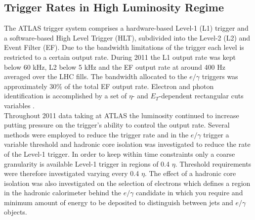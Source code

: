 \subsection{Trigger Rates in High Luminosity Regime}

	The ATLAS trigger system comprises a
	hardware-based Level-1 (L1) trigger and a software-based
	High Level Trigger (HLT), subdivided into the Level-2
	(L2) and Event Filter (EF). Due to the bandwidth
	limitations of the trigger each level is restricted to a
	certain output rate. During 2011 the L1 output rate was
	kept below 60 kHz, L2 below 5 kHz and the EF output
	rate at around 400 Hz averaged over the LHC fills. The
	bandwidth allocated to the $e/\gamma$ triggers was
	approximately 30\% of the total EF output rate.
	Electron and photon identification is accomplished by a
	set of $\eta$- and $E_{T}$-dependent rectangular cuts variables
	\cite{trig1, trig2}.\\
	Throughout 2011 data taking at ATLAS the luminosity continued to increase putting pressure on the trigger's ability to control the output rate. Several methods were employed to reduce the trigger rate and in the $e/\gamma$ trigger a variable threshold and hadronic core isolation was investigated to reduce the rate of the Level-1 trigger. In order to keep within time constraints only a coarse granularity is available Level-1 trigger in regions of 0.4 $\eta$. Threshold requirements were therefore investigated varying every 0.4 $\eta$. The effect of a hadronic core isolation was also investigated on the selection of electrons which defines a region in the hadronic calorimeter behind the $e/\gamma$ candidate in which you require and minimum amount of energy to be deposited to distinguish between jets and $e/\gamma$ objects. 


